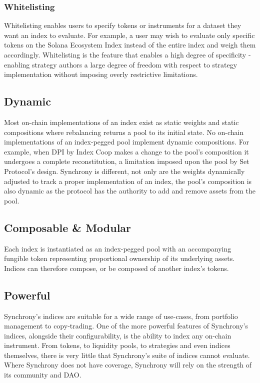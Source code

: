 \documentclass[10pt]{article}
\begin{document}
					\subsubsection{Whitelisting}
					Whitelisting enables users to specify tokens or instruments for a dataset they
					want an index to evaluate. For example, a user may wish to evaluate only
					specific tokens on the Solana Ecosystem Index instead of the entire index and
					weigh them accordingly. Whitelisting is the feature that enables a high degree
					of specificity - enabling strategy authors a large degree of freedom with
					respect to strategy implementation without imposing overly restrictive
					limitations.

					\subsection{Dynamic}
					Most on-chain implementations of an index exist as static weights and static
					compositions where rebalancing returns a pool to its initial state. No on-chain
					implementations of an index-pegged pool implement dynamic compositions. For
					example, when DPI by Index Coop makes a change to the pool's composition it
					undergoes a complete reconstitution, a limitation imposed upon the pool by Set
					Protocol's design. Synchrony is different, not only are the weights dynamically
					adjusted to track a proper implementation of an index, the pool's composition is
					also dynamic as the protocol has the authority to add and remove assets from the
					pool.

					\subsection{Composable \& Modular}
					Each index is instantiated as an index-pegged pool with an accompanying fungible
					token representing proportional ownership of its underlying assets. Indices can
					therefore compose, or be composed of another index's tokens.

					\subsection{Powerful}
					Synchrony's indices are suitable for a wide range of use-cases, from portfolio
					management to copy-trading. One of the more powerful features of Synchrony's
					indices, alongside their configurability, is the ability to index any on-chain
					instrument. From tokens, to liquidity pools, to strategies and even indices
					themselves, there is very little that Synchrony's suite of indices cannot
					evaluate. Where Synchrony does not have coverage, Synchrony will rely on the
					strength of its community and DAO.
					
\end{document}
